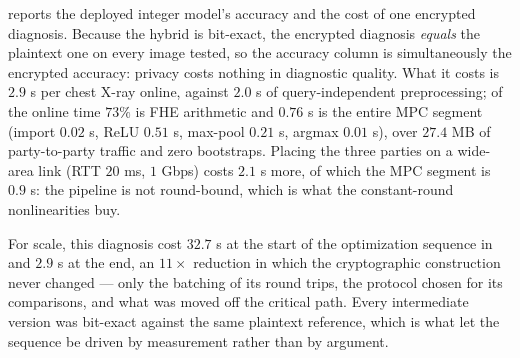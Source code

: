 \documentclass[11pt]{article}
\theoremstyle{plain}
\theoremstyle{definition}
\theoremstyle{remark}
\begin{document}
 reports the deployed integer model's accuracy and the
cost of one encrypted diagnosis. Because the hybrid is bit-exact, the
encrypted diagnosis \emph{equals} the plaintext one on every image tested, so
the accuracy column is simultaneously the encrypted accuracy: privacy costs
nothing in diagnostic quality. What it costs is $2.9$ s per chest X-ray
online, against $2.0$ s of query-independent preprocessing; of the online
time $73\%$ is FHE arithmetic and $0.76$ s is the entire MPC segment
(import $0.02$ s, ReLU $0.51$ s, max-pool $0.21$ s, argmax $0.01$ s), over
$27.4$ MB of party-to-party traffic and zero bootstraps. Placing the three
parties on a wide-area link (RTT $20$ ms, $1$ Gbps) costs $2.1$ s more, of
which the MPC segment is $0.9$ s: the pipeline is not round-bound, which is
what the constant-round nonlinearities buy.

For scale, this diagnosis cost $32.7$ s at the start of the optimization
sequence in  and $2.9$ s at the end, an $11\times$ reduction in
which the cryptographic construction never changed --- only the batching of
its round trips, the protocol chosen for its comparisons, and what was moved
off the critical path. Every intermediate version was bit-exact against the
same plaintext reference, which is what let the sequence be driven by
measurement rather than by argument.
\end{document}
